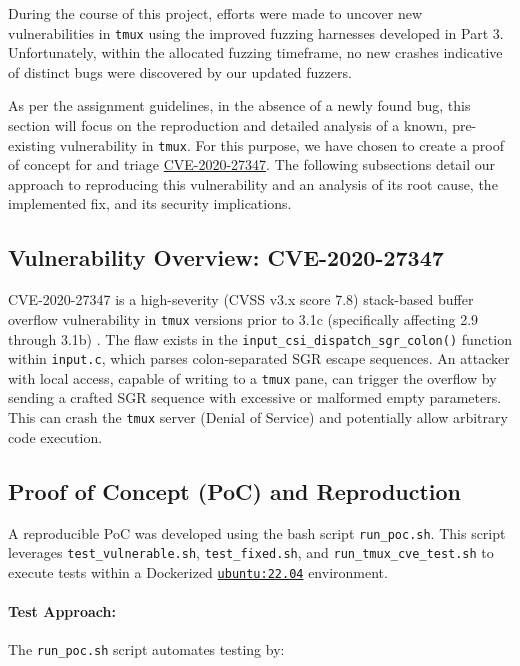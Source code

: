 During the course of this project, efforts were made to uncover new vulnerabilities in \texttt{tmux} using the improved fuzzing harnesses developed in Part 3. Unfortunately, within the allocated fuzzing timeframe, no new crashes indicative of distinct bugs were discovered by our updated fuzzers.

As per the assignment guidelines, in the absence of a newly found bug, this section will focus on the reproduction and detailed analysis of a known, pre-existing vulnerability in \texttt{tmux}. For this purpose, we have chosen to create a proof of concept for and triage \href{https://www.cve.org/CVERecord?id=CVE-2020-27347}{CVE-2020-27347}. The following subsections detail our approach to reproducing this vulnerability and an analysis of its root cause, the implemented fix, and its security implications.

\subsection{Vulnerability Overview: CVE-2020-27347}

CVE-2020-27347 is a high-severity (CVSS v3.x score 7.8) stack-based buffer overflow vulnerability in {\texttt{tmux}} versions prior to 3.1c (specifically affecting 2.9 through 3.1b) \cite{CVE-2020-27347}. The flaw exists in the \texttt{input\_csi\_dispatch\_sgr\_colon()} function within \texttt{input.c}, which parses colon-separated SGR escape sequences. An attacker with local access, capable of writing to a {\texttt{tmux}} pane, can trigger the overflow by sending a crafted SGR sequence with excessive or malformed empty parameters. This can crash the \texttt{tmux} server (Denial of Service) and potentially allow arbitrary code execution.

\subsection{Proof of Concept (PoC) and Reproduction}

A reproducible PoC was developed using the bash script \texttt{run\_poc.sh}. This script leverages \texttt{test\_vulnerable.sh}, \texttt{test\_fixed.sh}, and \texttt{run\_tmux\_cve\_test.sh} to execute tests within a Dockerized \href{https://hub.docker.com/layers/library/ubuntu/22.04/images/sha256-a76d0e9d99f0e91640e35824a6259c93156f0f07b7778ba05808c750e7fa6e68}{\texttt{ubuntu:22.04}} environment.

\paragraph{Test Approach:}
The \texttt{run\_poc.sh} script automates testing by:

